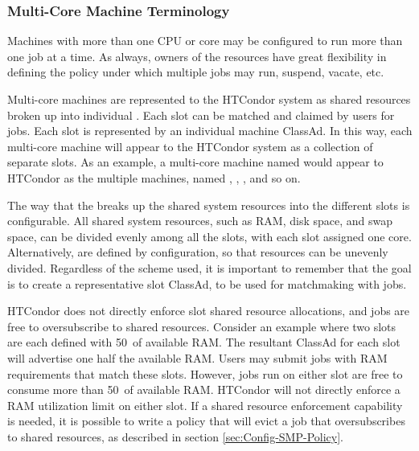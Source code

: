 \subsubsection{\label{sec:Configuring-SMP}
Multi-Core Machine Terminology}

Machines with more than one CPU or core may
be configured to run more than one job at a time.
As always, owners of the resources have great flexibility in defining
the policy under which multiple jobs may run, suspend, vacate, etc.  

Multi-core machines are represented to the HTCondor system as
shared resources broken up into individual .
Each slot can be matched and claimed by users for jobs.
Each slot is represented by an individual machine ClassAd.
In this way, each multi-core machine will appear to the HTCondor system as
a collection of separate slots.  
As an example, a multi-core machine named
 would appear to HTCondor as the
multiple machines, named ,
,
, and so on.

The way that the  breaks up the
shared system resources into the different slots
is configurable.
All shared system resources, such as RAM, disk space, and swap space,
can be divided evenly among all the slots, with each
slot assigned one core.
Alternatively, 
 are defined by configuration, 
so that resources can be unevenly divided.
Regardless of the scheme used, it is important
to remember that the goal is to create a representative slot ClassAd,
to be used for matchmaking with jobs.

HTCondor does not
directly enforce slot shared resource allocations, and jobs
are free to oversubscribe to shared resources.
Consider an example where two slots are each defined with 50\Percent\ of
available RAM.  The resultant ClassAd for each slot will advertise one
half the available RAM.  Users may submit jobs with RAM requirements
that match these slots.  However, jobs run on either slot are free to
consume more than 50\Percent\ of available RAM.  HTCondor will not
directly enforce a RAM utilization limit on either slot.  If a shared
resource enforcement capability is needed, 
it is possible to write a
policy that will evict a job that oversubscribes to shared
resources, as described in section \ref{sec:Config-SMP-Policy}.

